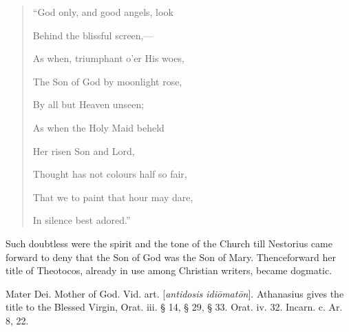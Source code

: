\begin{quote}

``God only, and good angels, look

Behind the
blissful screen,—

As when, triumphant o'er His woes,

The Son of God by moonlight rose,

By all but
Heaven unseen;

As when the Holy Maid beheld

Her risen Son
and Lord,

Thought has not colours half so fair,

That we to paint that hour may dare,

In silence
best adored.''

\end{quote}

Such doubtless were the spirit and the tone of
the Church till Nestorius came forward to deny that the Son of God was
the Son of Mary. Thenceforward her title of Theotocos, already in use
among Christian writers, became dogmatic.


Mater Dei. Mother of God. Vid. art. [\emph{antidosis
idi\={o}mat\={o}n}]. Athanasius gives the title to the
Blessed Virgin, Orat. iii. § 14, § 29, § 33. Orat. iv. 32. Incarn.
c. Ar. 8, 22.

